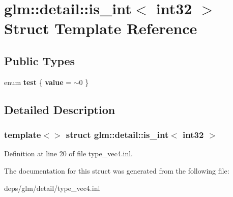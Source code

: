 \hypertarget{structglm_1_1detail_1_1is__int_3_01int32_01_4}{}\section{glm\+:\+:detail\+:\+:is\+\_\+int$<$ int32 $>$ Struct Template Reference}
\label{structglm_1_1detail_1_1is__int_3_01int32_01_4}
\subsection*{Public Types}
\begin{DoxyCompactItemize}
\item 
\mbox{\label{structglm_1_1detail_1_1is__int_3_01int32_01_4_ad400146c56b42f07c8c14c71c5f7322f}} 
enum {\bfseries test} \{ {\bfseries value} = $\sim$0
 \}
\end{DoxyCompactItemize}


\subsection{Detailed Description}
\subsubsection*{template$<$$>$\newline
struct glm\+::detail\+::is\+\_\+int$<$ int32 $>$}



Definition at line 20 of file type\+\_\+vec4.\+inl.



The documentation for this struct was generated from the following file\+:\begin{DoxyCompactItemize}
\item 
deps/glm/detail/type\+\_\+vec4.\+inl\end{DoxyCompactItemize}
